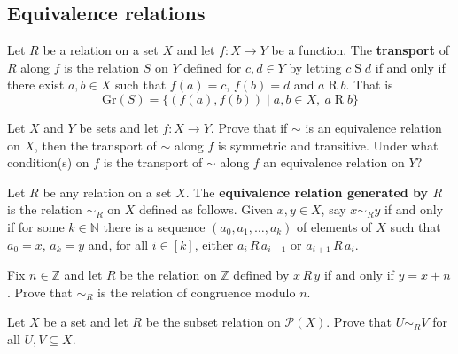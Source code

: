 
\subsection*{Equivalence relations}

\begin{definition}
\label{defTransportOfRelation}
Let $R$ be a relation on a set $X$ and let $f : X \to Y$ be a function. The \textbf{transport} of $R$ along $f$ is the relation $S$ on $Y$ defined for $c,d \in Y$ by letting $c \mathrel{S} d$ if and only if there exist $a,b \in X$ such that $f(a)=c$, $f(b)=d$ and $a \mathrel{R} b$. That is
\[ \mathrm{Gr}(S) = \{ (f(a), f(b)) \mid a,b \in X,~ a \mathrel{R} b \} \]
\end{definition}

\begin{chapex}
Let $X$ and $Y$ be sets and let $f : X \to Y$. Prove that if $\sim$ is an equivalence relation on $X$, then the transport of $\sim$ along $f$ is symmetric and transitive. Under what condition(s) on $f$ is the transport of $\sim$ along $f$ an equivalence relation on $Y$?
\end{chapex}

\begin{definition}
\label{defEquivalenceRelationGeneratedByRelation}
Let $R$ be any relation on a set $X$. The \textbf{equivalence relation generated by $R$} is the relation ${\sim}_R$ on $X$ defined as follows. Given $x,y \in X$, say $x \sim_R y$ if and only if for some $k \in \mathbb{N}$ there is a sequence $(a_0, a_1, \dots, a_k)$ of elements of $X$ such that $a_0=x$, $a_k=y$ and, for all $i \in [k]$, either $a_i\,R\,a_{i+1}$ or $a_{i+1}\,R\,a_i$.
\end{definition}

\begin{chapex}
\label{cqEquivalenceRelationGeneratedByRelationBegin}
Fix $n \in \mathbb{Z}$ and let $R$ be the relation on $\mathbb{Z}$ defined by $x\,R\,y$ if and only if $y=x+n$. Prove that ${\sim}_R$ is the relation of congruence modulo $n$.
\end{chapex}

\begin{chapex}
Let $X$ be a set and let $R$ be the subset relation on $\mathcal{P}(X)$. Prove that $U \mathrel{{\sim}_R} V$ for all $U, V \subseteq X$.
\end{chapex}

